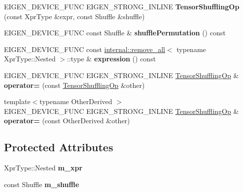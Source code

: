 \begin{DoxyCompactItemize}
E\+I\+G\+E\+N\+\_\+\+D\+E\+V\+I\+C\+E\+\_\+\+F\+U\+NC E\+I\+G\+E\+N\+\_\+\+S\+T\+R\+O\+N\+G\+\_\+\+I\+N\+L\+I\+NE {\bfseries Tensor\+Shuffling\+Op} (const Xpr\+Type \&expr, const Shuffle \&shuffle)
\item 
\mbox{\label{class_eigen_1_1_tensor_shuffling_op_a33c0520c63ee2377091f1cb5d74e1ed9}} 
E\+I\+G\+E\+N\+\_\+\+D\+E\+V\+I\+C\+E\+\_\+\+F\+U\+NC const Shuffle \& {\bfseries shuffle\+Permutation} () const
\item 
\mbox{\label{class_eigen_1_1_tensor_shuffling_op_a9dcda3d202608177a9a8a85f87335a93}} 
E\+I\+G\+E\+N\+\_\+\+D\+E\+V\+I\+C\+E\+\_\+\+F\+U\+NC const \hyperlink{struct_eigen_1_1internal_1_1remove__all}{internal\+::remove\+\_\+all}$<$ typename Xpr\+Type\+::\+Nested $>$\+::type \& {\bfseries expression} () const
\item 
\mbox{\label{class_eigen_1_1_tensor_shuffling_op_a05714d20a89f48754cd6e54ef6e9bc2f}} 
E\+I\+G\+E\+N\+\_\+\+D\+E\+V\+I\+C\+E\+\_\+\+F\+U\+NC E\+I\+G\+E\+N\+\_\+\+S\+T\+R\+O\+N\+G\+\_\+\+I\+N\+L\+I\+NE \hyperlink{class_eigen_1_1_tensor_shuffling_op}{Tensor\+Shuffling\+Op} \& {\bfseries operator=} (const \hyperlink{class_eigen_1_1_tensor_shuffling_op}{Tensor\+Shuffling\+Op} \&other)
\item 
\mbox{\label{class_eigen_1_1_tensor_shuffling_op_a96948159bfbecc33d3c2a2e7efd45c40}} 
{\footnotesize template$<$typename Other\+Derived $>$ }\\E\+I\+G\+E\+N\+\_\+\+D\+E\+V\+I\+C\+E\+\_\+\+F\+U\+NC E\+I\+G\+E\+N\+\_\+\+S\+T\+R\+O\+N\+G\+\_\+\+I\+N\+L\+I\+NE \hyperlink{class_eigen_1_1_tensor_shuffling_op}{Tensor\+Shuffling\+Op} \& {\bfseries operator=} (const Other\+Derived \&other)
\end{DoxyCompactItemize}
\subsection*{Protected Attributes}
\begin{DoxyCompactItemize}
\item 
\mbox{\label{class_eigen_1_1_tensor_shuffling_op_a1b5233c95d6a734bb76707947fb4e874}} 
Xpr\+Type\+::\+Nested {\bfseries m\+\_\+xpr}
\item 
\mbox{\label{class_eigen_1_1_tensor_shuffling_op_ad75a8ddc6a9a0bf4649253f0fd1b3b2f}} 
const Shuffle {\bfseries m\+\_\+shuffle}
\end{DoxyCompactItemize}
